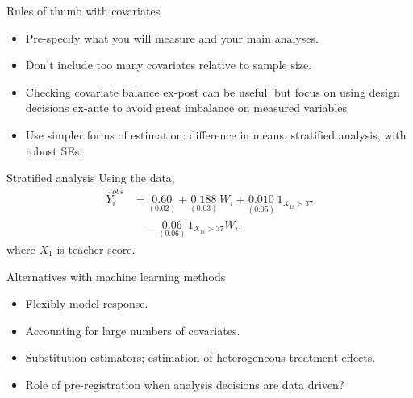 \documentclass[xcolor={dvipsnames},handout]{beamer}
\begin{document}
\begin{frame}{Rules of thumb with covariates}

\begin{itemize}
\item Pre-specify what you will measure and your main analyses. 
\item Don't include too many covariates relative to sample size. 
\item Checking covariate balance ex-post can be useful; but focus on using design decisions ex-ante to avoid great imbalance on measured variables
\item Use simpler forms of estimation: difference in means, stratified analysis, with robust SEs. 
\end{itemize}

\end{frame}



\begin{frame}{Stratified analysis}
Using the \cite{duflo2012incentives} data,
\begin{align*}
\hat Y_i^{obs}
  &= \underset{(0.02)}{0.60}
   + \underset{(0.03)}{0.188}\, W_i
   + \underset{(0.05)}{0.010}\, 1_{X_{1i}>37} \\
  &\quad - \underset{(0.06)}{0.06}\, 1_{X_{1i}>37}W_i .
\end{align*}
where $X_1$ is teacher score.
\end{frame}



\begin{frame}{Alternatives with machine learning methods}

\begin{itemize}
\item Flexibly model response. 
\item Accounting for large numbers of covariates. 
\item Substitution estimators; estimation of heterogeneous treatment effects. 
\item Role of pre-registration when analysis decisions are data driven?
\end{itemize}

\end{frame}
\end{document}
